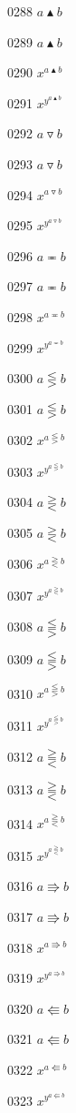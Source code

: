 \documentclass{article}
\begin{document}
0288 $a\blacktriangle b$\par
0289 $\displaystyle a\blacktriangle b$\par
0290 $x^{a\blacktriangle b}$\par
0291 $x^{y^{a\blacktriangle b}}$\par
0292 $a\triangledown b$\par
0293 $\displaystyle a\triangledown b$\par
0294 $x^{a\triangledown b}$\par
0295 $x^{y^{a\triangledown b}}$\par
0296 $a\eqcirc b$\par
0297 $\displaystyle a\eqcirc b$\par
0298 $x^{a\eqcirc b}$\par
0299 $x^{y^{a\eqcirc b}}$\par
0300 $a\lesseqgtr b$\par
0301 $\displaystyle a\lesseqgtr b$\par
0302 $x^{a\lesseqgtr b}$\par
0303 $x^{y^{a\lesseqgtr b}}$\par
0304 $a\gtreqless b$\par
0305 $\displaystyle a\gtreqless b$\par
0306 $x^{a\gtreqless b}$\par
0307 $x^{y^{a\gtreqless b}}$\par
0308 $a\lesseqqgtr b$\par
0309 $\displaystyle a\lesseqqgtr b$\par
0310 $x^{a\lesseqqgtr b}$\par
0311 $x^{y^{a\lesseqqgtr b}}$\par
0312 $a\gtreqqless b$\par
0313 $\displaystyle a\gtreqqless b$\par
0314 $x^{a\gtreqqless b}$\par
0315 $x^{y^{a\gtreqqless b}}$\par
0316 $a\Rrightarrow b$\par
0317 $\displaystyle a\Rrightarrow b$\par
0318 $x^{a\Rrightarrow b}$\par
0319 $x^{y^{a\Rrightarrow b}}$\par
0320 $a\Lleftarrow b$\par
0321 $\displaystyle a\Lleftarrow b$\par
0322 $x^{a\Lleftarrow b}$\par
0323 $x^{y^{a\Lleftarrow b}}$\par
\end{document}
